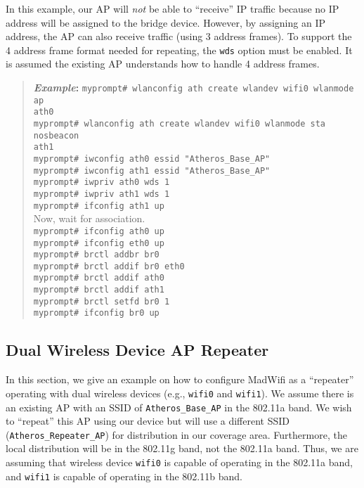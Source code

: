 \documentclass[10pt,fullpage]{article}
\newcommand{\mytt}[1]{{\texttt{#1}}}
\newcommand{\cmd}[1]{{\texttt{myprompt\# #1}}}
\newenvironment{example}{\begin{quote}\textbf{\textit{Example}:}}{\end{quote}}
\begin{document}
In this example, our AP will \emph{not} be able to ``receive'' IP traffic
because no IP address will be assigned to the bridge device.  However,
by assigning an IP address, the AP can also receive traffic (using 3
address frames).  To support the 4 address frame format needed for
repeating, the \mytt{wds} option must be enabled.  It is assumed the
existing AP understands how to handle 4 address frames.
\begin{example}
  \cmd{wlanconfig ath create wlandev wifi0 wlanmode ap}\\
  \mytt{ath0}\\
  \cmd{wlanconfig ath create wlandev wifi0 wlanmode sta nosbeacon}\\
  \mytt{ath1}\\
  \cmd{iwconfig ath0 essid "Atheros\_Base\_AP"}\\
  \cmd{iwconfig ath1 essid "Atheros\_Base\_AP"}\\
  \cmd{iwpriv ath0 wds 1}\\
  \cmd{iwpriv ath1 wds 1}\\
  \cmd{ifconfig ath1 up}\\
  Now, wait for association.\\
  \cmd{ifconfig ath0 up}\\
  \cmd{ifconfig eth0 up}\\
  \cmd{brctl addbr br0}\\
  \cmd{brctl addif br0 eth0}\\
  \cmd{brctl addif ath0}\\
  \cmd{brctl addif ath1}\\
  \cmd{brctl setfd br0 1}\\
  \cmd{ifconfig br0 up}
\end{example}

\subsection{Dual Wireless Device AP Repeater}
In this section, we give an example on how to configure MadWifi as a
``repeater'' operating with dual wireless devices (e.g., \mytt{wifi0}
and \mytt{wifi1}).  We assume there
is an existing AP with an SSID of \mytt{Atheros\_Base\_AP} in the
802.11a band.  We wish to ``repeat''
this AP using our device but will use a different SSID
(\mytt{Atheros\_Repeater\_AP}) for
distribution in our coverage area.  Furthermore, the local
distribution will be in the 802.11g band, not the 802.11a band.
Thus, we are assuming that wireless device \mytt{wifi0} is capable of
operating in the 802.11a band, and \mytt{wifi1} is capable of
operating in the 802.11b band.  
\end{document}
